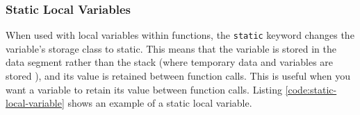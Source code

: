 \documentclass[main.tex]{subfiles}
\begin{document}
\subsubsection{Static Local Variables}
When used with local variables within functions, the \texttt{static} keyword changes the variable's storage class to static. This means that the variable is stored in the data segment rather than the stack (where temporary data and variables are stored \cite{embedded_com_Static}), and its value is retained between function calls. This is useful when you want a variable to retain its value between function calls. Listing \ref{code:static-local-variable} shows an example of a static local variable.


\end{document}
